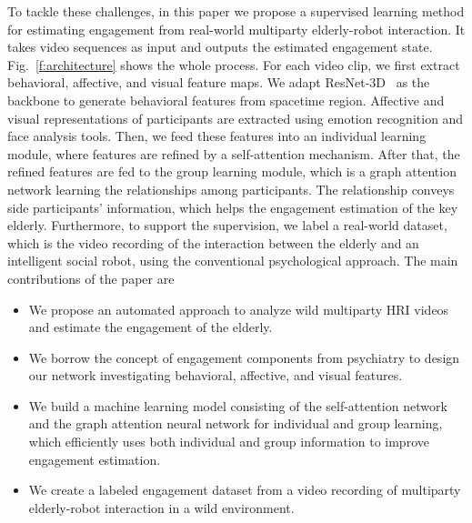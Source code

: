 \documentclass[VANCOUVER,STIX1COL]{WileyNJD-v2}
\begin{document}
To tackle these challenges, in this paper we propose a supervised learning method for estimating engagement from real-world multiparty elderly-robot interaction. It takes video sequences as input and outputs the estimated engagement state. Fig.~\ref{f:architecture} shows the whole process. For each video clip, we first extract behavioral, affective, and visual feature maps. We adapt ResNet-3D~\cite{Hara2018Can} as the backbone to generate behavioral features from spacetime region. Affective and visual representations of participants are extracted using emotion recognition and face analysis tools. Then, we feed these features into an individual learning module, where features are refined by a self-attention mechanism. After that, the refined features are fed to the group learning module, which is a graph attention network learning the relationships among participants. The relationship conveys side participants' information, which helps the engagement estimation of the key elderly. Furthermore, to support the supervision, we label a real-world dataset, which is the video recording of the interaction between the elderly and an intelligent social robot, using the conventional psychological approach. The main contributions of the paper are
\begin{itemize}
  \item We propose an automated approach to analyze wild multiparty HRI videos and estimate the engagement of the elderly.
  \item We borrow the concept of engagement components from psychiatry to design our network investigating behavioral, affective, and visual features.
  \item We build a machine learning model consisting of the self-attention network and the graph attention neural network for individual and group learning, which efficiently uses both individual and group information to improve engagement estimation.
  \item We create a labeled engagement dataset from a video recording of multiparty elderly-robot interaction in a wild environment.
\end{itemize}


\end{document}
